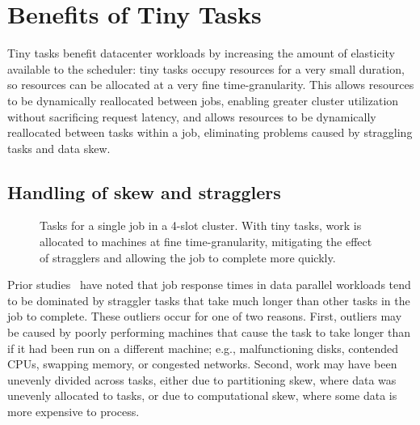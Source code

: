\section{Benefits of Tiny Tasks}
\label{sec:benefits}

Tiny tasks benefit datacenter workloads by increasing the amount of elasticity
available to the scheduler: tiny tasks occupy resources for a very small
duration, so resources can be allocated at a very fine time-granularity. This
allows resources to be dynamically reallocated between jobs, enabling greater
cluster utilization without sacrificing request latency, and allows
resources to be dynamically
reallocated between tasks within a job, eliminating problems caused
by straggling tasks and data skew.

\subsection{Handling of skew and stragglers}

\begin{figure}[t]
\centering
{}
\vspace{-0.1in}
\caption{Tasks for a single job in a 4-slot cluster.
With tiny tasks, work is allocated to machines at fine
time-granularity, mitigating the effect of stragglers and allowing
the job to complete more quickly.}
\vspace{-2ex}
\label{fig:tiny_diagram}
\end{figure}


Prior studies~\cite{ananthanarayanan2010reining,zaharia2008improving} have
noted that job response times in data parallel workloads tend to be
dominated by straggler tasks that take much longer than other tasks in the
job to complete.
These outliers occur for one of two reasons.
First, outliers may be caused by poorly performing machines that cause the
task to take longer than if it had been run on a different machine; e.g.,
malfunctioning disks, contended CPUs, swapping memory, or congested networks.
Second, work may have been unevenly
divided across tasks, either due to
partitioning skew, where data was unevenly allocated to tasks, or due to
computational skew, where some data is more expensive to process.

